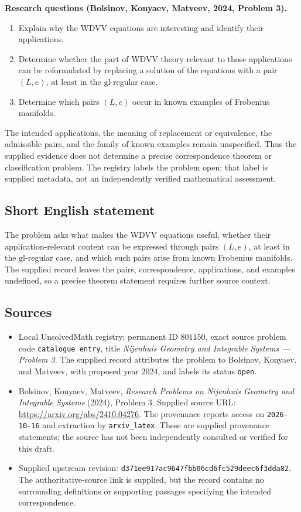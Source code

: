 \documentclass[11pt]{article}
\begin{document}
\textbf{Research questions (Bolsinov, Konyaev, Matveev, 2024, Problem 3).}
\begin{enumerate}
\item Explain why the WDVV equations are interesting and identify their applications.
\item Determine whether the part of WDVV theory relevant to those applications can be reformulated by replacing a solution of the equations with a pair \((L,e)\), at least in the \(\mathrm{gl}\)-regular case.
\item Determine which pairs \((L,e)\) occur in known examples of Frobenius manifolds.
\end{enumerate}
The intended applications, the meaning of replacement or equivalence, the admissible pairs, and the family of known examples remain unspecified. Thus the supplied evidence does not determine a precise correspondence theorem or classification problem. The registry labels the problem open; that label is supplied metadata, not an independently verified mathematical assessment.
\subsection{Short English statement}
The problem asks what makes the WDVV equations useful, whether their application-relevant content can be expressed through pairs \((L,e)\), at least in the \(\mathrm{gl}\)-regular case, and which such pairs arise from known Frobenius manifolds. The supplied record leaves the pairs, correspondence, applications, and examples undefined, so a precise theorem statement requires further source context.
\subsection{Sources}
\begin{itemize}
\item Local UnsolvedMath registry: permanent ID \(801150\), exact source problem code \texttt{catalogue entry}, title \emph{Nijenhuis Geometry and Integrable Systems --- Problem 3}. The supplied record attributes the problem to Bolsinov, Konyaev, and Matveev, with proposed year \(2024\), and labels its status \texttt{open}.
\item Bolsinov, Konyaev, Matveev, \emph{Research Problems on Nijenhuis Geometry and Integrable Systems} (2024), Problem 3. Supplied source URL: \url{https://arxiv.org/abs/2410.04276}. The provenance reports access on \texttt{2026-10-16} and extraction by \texttt{arxiv\_latex}. These are supplied provenance statements; the source has not been independently consulted or verified for this draft.
\item Supplied upstream revision: \texttt{d371ee917ac9647fbb06cd6fc529deec6f3dda82}. The authoritative-source link is supplied, but the record contains no surrounding definitions or supporting passages specifying the intended correspondence.
\end{itemize}
\end{document}

